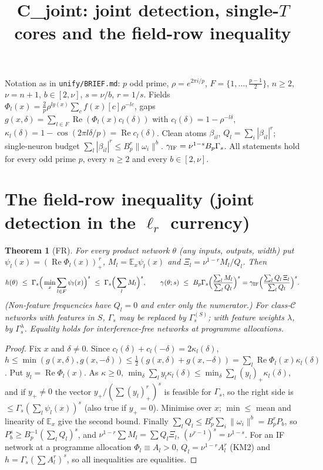 \documentclass[11pt]{article}
\title{C\_joint: joint detection, single-$T$ cores and the field-row inequality}
\date{}
\newtheorem{theorem}{Theorem}
\theoremstyle{remark}
\renewcommand{\Re}{\operatorname{Re}}
\begin{document}
\maketitle

\noindent Notation as in \texttt{unify/BRIEF.md}: $p$ odd prime, $\rho=e^{2\pi i/p}$, $F=\{1,\dots,\frac{p-1}2\}$,
$n\ge2$, $\nu=n+1$, $b\in[2,\nu]$, $s=\nu/b$, $r=1/s$. Fields
$\Phi_l(x)=\frac2p\rho^{l y(x)}\sum_c f(x)[c]\rho^{-lc}$, gaps $g(x,\delta)=\sum_{l\in F}\Re(\Phi_l(x)c_l(\delta))$ with
$c_l(\delta)=1-\rho^{-l\delta}$, $\kappa_l(\delta)=1-\cos(2\pi l\delta/p)=\Re c_l(\delta)$.
Clean atoms $\beta_{il}$, $Q_l=\sum_i|\beta_{il}|^r$; single-neuron budget $\sum_l|\beta_{il}|^r\le B_p^r\|\omega_i\|^b$.
$\gamma_{\rm IF}=\nu^{1-s}B_p\Gamma_s$. All statements hold for every odd prime $p$, every $n\ge2$ and every $b\in[2,\nu]$.

\section{The field-row inequality (joint detection in the $\ell_r$ currency)}

\begin{theorem}[FR]\label{thm:fr}
For every product network $\theta$ (any inputs, outputs, width) put $\psi_l(x)=(\Re\Phi_l(x))_+^{\,r}$,
$M_l=\mathbb E_x\psi_l(x)$ and $\Xi_l=\nu^{1-r}M_l/Q_l$. Then
\[
h(\theta)\ \le\ \Gamma_s\Big(\min_{x}\sum_{l\in F}\psi_l(x)\Big)^{s}\ \le\ \Gamma_s\Big(\sum_l M_l\Big)^s,
\qquad
\gamma(\theta;s)\ \le\ B_p\Gamma_s\Big(\frac{\sum_l M_l}{\sum_l Q_l}\Big)^{s}
=\gamma_{\rm IF}\Big(\frac{\sum_l Q_l\,\Xi_l}{\sum_l Q_l}\Big)^{s}.
\]
(Non-feature frequencies have $Q_l=0$ and enter only the numerator.) For class-$\mathcal C$ networks with features in $S$,
$\Gamma_s$ may be replaced by $\Gamma^{(S)}_s$; with feature weights $\lambda$, by $\Gamma^{\lambda}_s$.
Equality holds for interference-free networks at programme allocations.
\end{theorem}
\begin{proof}
Fix $x$ and $\delta\neq0$. Since $c_l(\delta)+c_l(-\delta)=2\kappa_l(\delta)$,
$h\le\min(g(x,\delta),g(x,-\delta))\le\frac12(g(x,\delta)+g(x,-\delta))=\sum_l\Re\Phi_l(x)\kappa_l(\delta)$.
Put $y_l=\Re\Phi_l(x)$. As $\kappa\ge0$, $\min_\delta\sum_l y_l\kappa_l(\delta)\le\min_\delta\sum_l (y_l)_+\kappa_l(\delta)$, and if
$y_+\ne0$ the vector $y_+/(\sum (y_l)_+^r)^s$ is feasible for $\Gamma_s$, so the right side is $\le\Gamma_s(\sum_l\psi_l(x))^s$
(also true if $y_+=0$). Minimise over $x$; $\min\le$ mean and linearity of $\mathbb E_x$ give the second bound. Finally
$\sum_lQ_l\le B_p^r\sum_i\|\omega_i\|^b=B_p^rP_b$, so $P_b^s\ge B_p^{-1}(\sum_lQ_l)^s$, and $\nu^{1-r}\sum M_l=\sum Q_l\Xi_l$,
$(\nu^{r-1})^s=\nu^{1-s}$. For an IF network at a programme allocation $\Phi_l\equiv A_l>0$, $Q_l=\nu^{1-r}A_l^r$ (KM2) and
$h=\Gamma_s(\sum A_l^r)^s$, so all inequalities are equalities.
\end{proof}
\end{document}

